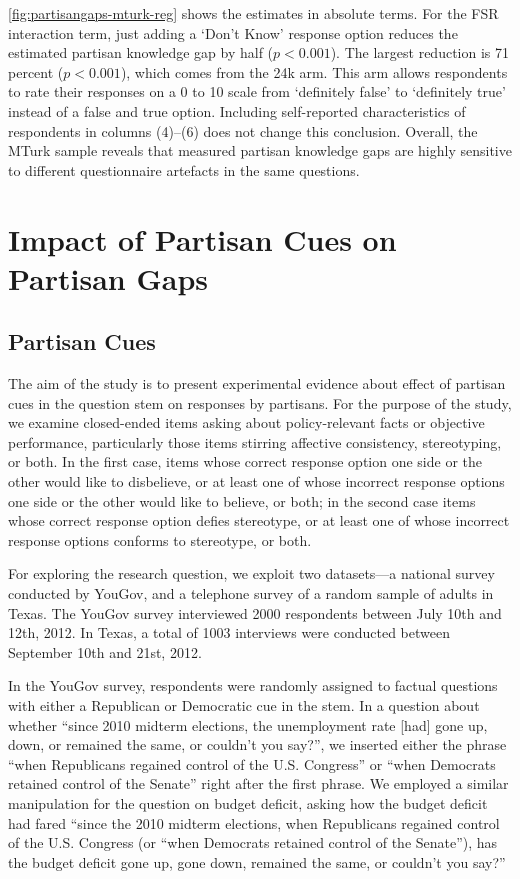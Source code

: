 \documentclass[12pt, letterpaper]{article}
\begin{document}
\cref{fig:partisangaps-mturk-reg} shows the estimates in absolute terms. For the FSR interaction term, just adding a `Don't Know' response option reduces the estimated partisan knowledge gap by half ($p<0.001$).
The largest reduction is 71 percent ($p<0.001$), which comes from the 24k arm. This arm allows respondents to rate their responses on a 0 to 10 scale from `definitely false' to `definitely true' instead of a false and true option. Including self-reported characteristics of respondents in columns (4)--(6) does not change this conclusion. Overall, the MTurk sample reveals that measured partisan knowledge gaps are highly sensitive to different questionnaire artefacts in the same questions.


\section*{Impact of Partisan Cues on Partisan Gaps}

\subsection*{Partisan Cues}\label{subsec:partisan-cues}
The aim of the study is to present experimental evidence about effect of partisan cues in the question stem on responses by partisans. For the purpose of the study, we examine closed-ended items asking about policy-relevant facts or objective performance, particularly those items stirring affective consistency, stereotyping, or both.  In the first case, items whose correct response option one side or the other would like to disbelieve, or at least one of whose incorrect response options one side or the other would like to believe, or both; in the second case items whose correct response option defies stereotype, or at least one of whose incorrect response options conforms to stereotype, or both.  

For exploring the research question, we exploit two datasets---a national survey conducted by YouGov, and a telephone survey of a random sample of adults in Texas. The YouGov survey interviewed 2000 respondents between July 10th and 12th, 2012.  In Texas, a total of 1003 interviews were conducted between September 10th and 21st, 2012. 

In the YouGov survey, respondents were randomly assigned to factual questions with either a Republican or Democratic cue in the stem. In a question about whether ``since 2010 midterm elections, the unemployment rate [had] gone up, down, or remained the same, or couldn't you say?'', we inserted either the phrase “when Republicans regained control of the U.S. Congress'' or ``when Democrats retained control of the Senate” right after the first phrase. We employed a similar manipulation for the question on budget deficit, asking how the budget deficit had fared “since the 2010 midterm elections, when Republicans regained control of the U.S. Congress (or ``when Democrats retained control of the Senate''), has the budget deficit gone up, gone down, remained the same, or couldn't you say?''
\end{document}
